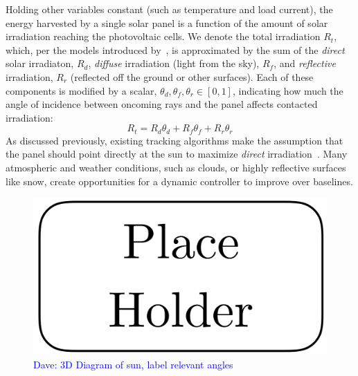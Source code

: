 \documentclass[11pt]{article}
\newcommand{\dnote}[1]{\textcolor{blue}{Dave: #1}}
\begin{document}
Holding other variables constant (such as temperature and load current), the energy harvested by a single solar panel is a function of the amount of solar irradiation reaching the photovoltaic cells. We denote the total irradiation $R_t$, which, per the models introduced by~\citet{kamali2006estimating}, is approximated by the sum of the {\it direct} solar irradiaton, $R_d$, {\it diffuse} irradiation (light from the sky), $R_f$, and {\it reflective} irradiation, $R_r$ (reflected off the ground or other surfaces). Each of these components is modified by a scalar, $\theta_d, \theta_f, \theta_r \in [0,1]$, indicating how much the angle of incidence between oncoming rays and the panel affects contacted irradiation:
\begin{equation}
R_t = R_d \theta_d + R_f \theta_f + R_r \theta_r
\label{eq:eq:total_rads}
\end{equation}
As discussed previously, existing tracking algorithms make the assumption that the panel should point directly at the sun to maximize {\it direct} irradiation~\cite{Grena2008,Grena2012,reda2004solar}. Many atmospheric and weather conditions, such as clouds, or highly reflective surfaces like snow, create opportunities for a dynamic controller to improve over baselines.

\begin{figure}
\begin{center}
\includegraphics[scale=0.3]{figures/placeholder.png}
\caption{\dnote{3D Diagram of sun, label relevant angles}}
\end{center}
\end{figure}


\end{document}
